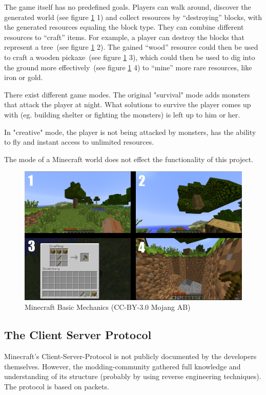 The game itself has no predefined goals. Players can walk around, discover the generated world (see figure \ref{mc_mechanics} 1) and collect resources by ``destroying'' blocks, with the generated resources equaling the block type. They can combine different resources to ``craft'' items. For example, a player can destroy the blocks that represent a tree~(see figure \ref{mc_mechanics} 2). The gained ``wood'' resource could then be used to craft a wooden pickaxe~(see figure \ref{mc_mechanics} 3), which could then be used to dig into the ground more effectively~(see figure \ref{mc_mechanics} 4) to ``mine'' more rare resources, like iron or gold.

There exist different game modes. The original "survival" mode adds monsters that attack the player at night. What solutions to survive the player comes up with (eg. building shelter or fighting the monsters) is left up to him or her.

In "creative" mode, the player is not being attacked by monsters, has the ability to fly and instant access to unlimited resources.

The mode of a Minecraft world does not effect the functionality of this project.

\begin{figure}[h]
  \centering
    \includegraphics[width=15cm]{graphics/minecraft_mechanics}
  \caption{Minecraft Basic Mechanics  (CC-BY-3.0 Mojang AB)} %
  \label{mc_mechanics}
\end{figure}

        \subsection{The Client Server Protocol}
Minecraft's Client-Server-Protocol is not publicly documented by the developers themselves. However, the modding-community gathered full knowledge and understanding of its structure (probably by using reverse engineering techniques). The protocol is based on packets. 

